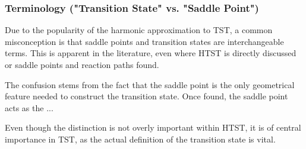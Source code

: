 \incomplete

\subsubsection{Terminology ("Transition State" vs. "Saddle Point")}
Due to the popularity of the harmonic approximation to TST, a common misconception is that saddle points and transition states are interchangeable terms.
This is apparent in the literature, even where HTST is directly discussed or saddle points and reaction paths found.

The confusion stems from the fact that the saddle point is the only geometrical feature needed to construct the transition state.
Once found, the saddle point acts as the ... 

Even though the distinction is not overly important within HTST, it is of central importance in TST, as the actual definition of the transition state is vital.

\incomplete
